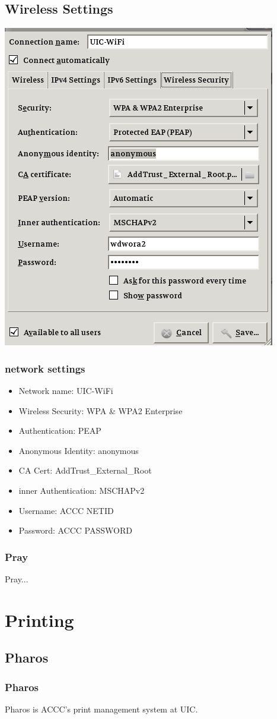 \documentclass[hyperref={pdfpagelabels=false}]{beamer}
\begin{document}
\subsection{Wireless Settings}
\frame
{
     \includegraphics[totalheight=0.8\textheight]{uicwificonfig.png}
}
\frame
{
    \frametitle{network settings}
    \begin{itemize}
    \item{Network name: UIC-WiFi}
    \item{Wireless Security: WPA & WPA2 Enterprise}
    \item{Authentication: PEAP}
    \item{Anonymous Identity: anonymous}
    \item{CA Cert: AddTrust_External_Root}
    \item{inner Authentication: MSCHAPv2}
    \item{Username: ACCC NETID}
    \item{Password: ACCC PASSWORD}
    \end{itemize}
}
\frame
{
    \frametitle{Pray}
    Pray...
}
\section{Printing}
\subsection{Pharos}
\frame
{
    \frametitle{Pharos}
    Pharos is ACCC's print management system at UIC.
}
\end{document}
